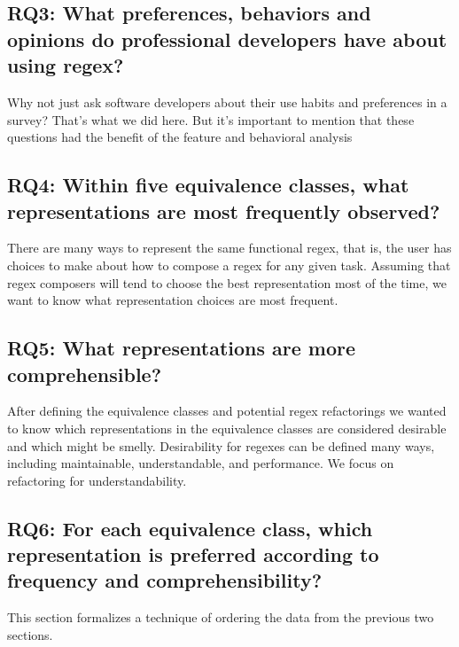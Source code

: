 \subsection{RQ3: What preferences, behaviors and opinions do professional developers have about using regex?}

 Why not just ask software developers about their use habits and preferences in a survey?  That's what we did here.  But it's important to mention that these questions had the benefit of the feature and behavioral analysis



\subsection{RQ4: Within five equivalence classes, what representations are most frequently observed?}

There are many ways to represent the same functional regex, that is, the user has choices to make about how to compose a regex for any given task.  Assuming that regex composers will tend to choose the best representation most of the time, we want to know what representation choices are most frequent.

\subsection{RQ5: What representations are more comprehensible?}

After defining the equivalence classes and potential  regex refactorings we wanted to know which representations in the equivalence classes  are considered desirable and which might be smelly. Desirability for regexes can be defined many ways, including maintainable,  understandable, and performance.
We focus on refactoring for understandability.

\subsection{RQ6: For each equivalence class, which representation is preferred according to frequency and comprehensibility?}

This section formalizes a technique of ordering the data from the previous two sections.




